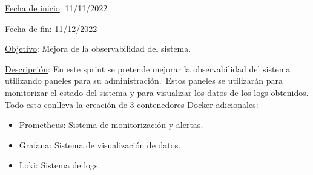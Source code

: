 
\underline{Fecha de inicio}: 11/11/2022

\underline{Fecha de fin}: 11/12/2022

\underline{Objetivo}:
Mejora de la observabilidad del sistema.

\underline{Descripción}:
En este sprint se pretende mejorar la observabilidad del sistema utilizando paneles para su administración.\ Estos
paneles se utilizarán para monitorizar el estado del sistema y para visualizar los datos de los logs obtenidos.
Todo esto conlleva la creación de 3 contenedores Docker adicionales:

\begin{itemize}
	\item Prometheus:
	Sistema de monitorización y alertas.
	\item Grafana:
	Sistema de visualización de datos.
	\item Loki:
	Sistema de logs.
\end{itemize}


